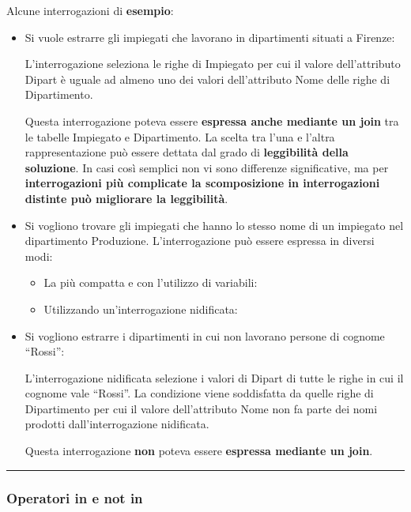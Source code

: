 \documentclass[a4paper]{article}
\newcommand{\longline}{\noindent\rule{\textwidth}{0.4pt}}
\newcommand{\dquotes}[1]{``#1''}
\begin{document}
	\noindent
	Alcune interrogazioni di \textcolor{Green4}{\textbf{esempio}}:
	\begin{itemize}
		\item Si vuole estrarre gli impiegati che lavorano in dipartimenti situati a Firenze:
		
		L'interrogazione seleziona le righe di \textsf{Impiegato} per cui il valore dell'attributo \textsf{Dipart} è uguale ad almeno uno dei valori dell'attributo \textsf{Nome} delle righe di \textsf{Dipartimento}.
		
		Questa interrogazione poteva essere \textbf{espressa anche mediante un join} tra le tabelle \textsf{Impiegato} e \textsf{Dipartimento}. La scelta tra l'una e l'altra rappresentazione può essere dettata dal grado di \textbf{leggibilità della soluzione}. In casi così semplici non vi sono differenze significative, ma per \textbf{interrogazioni più complicate la scomposizione in interrogazioni distinte può migliorare la leggibilità}.\newpage
		
		\item Si vogliono trovare gli impiegati che hanno lo stesso nome di un impiegato nel dipartimento Produzione. L'interrogazione può essere espressa in diversi modi:
		\begin{itemize}
			\item La più compatta e con l'utilizzo di variabili:
			
			
			\item Utilizzando un'interrogazione nidificata:
			
		\end{itemize}
		
		\item Si vogliono estrarre i dipartimenti in cui non lavorano persone di cognome \dquotes{Rossi}:
		
		L'interrogazione nidificata selezione i valori di \textsf{Dipart} di tutte le righe in cui il cognome vale \dquotes{Rossi}. La condizione viene soddisfatta da quelle righe di \textsf{Dipartimento} per cui il valore dell'attributo \textsf{Nome} non fa parte dei nomi prodotti dall'interrogazione nidificata.
		
		Questa interrogazione \textbf{non} poteva essere \textbf{espressa mediante un join}.
	\end{itemize}

	\longline
	
	\subsubsection{Operatori \textsf{in} e \textsf{not in}}
	
\end{document}
